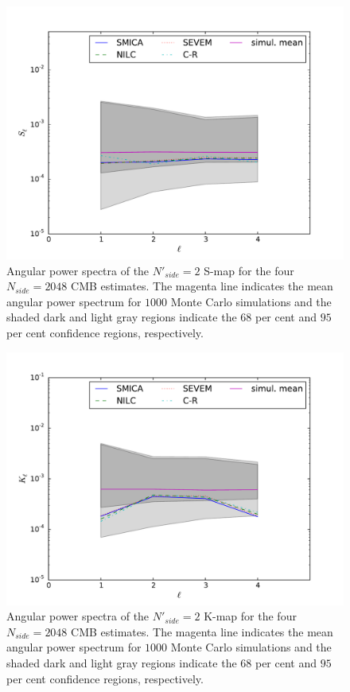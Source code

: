 \begin{figure}
\centering
\includegraphics[width=\textwidth]{figures/chapter-vsk/Sl_u73.pdf}
\caption{Angular power spectra of the $N'_{side} = 2$ S-map for the four $N_{side} = 2048$ CMB estimates. The magenta line indicates the mean angular power spectrum for $1000$ Monte Carlo simulations and the shaded dark and light gray regions indicate the $68$ per cent and $95$ per cent confidence regions, respectively.}
\label{Fig:4a}
\end{figure}

\begin{figure}
\centering
\includegraphics[width=\textwidth]{figures/chapter-vsk/Kl_u73.pdf}
\caption{Angular power spectra of the $N'_{side} = 2$ K-map for the four $N_{side} = 2048$ CMB estimates. The magenta line indicates the mean angular power spectrum for $1000$ Monte Carlo simulations and the shaded dark and light gray regions indicate the $68$ per cent and $95$ per cent confidence regions, respectively.}
\label{Fig:4b}
\end{figure}

